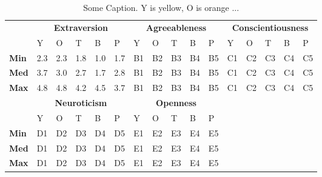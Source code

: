 \begin{table}
\renewcommand{\arraystretch}{1.2}
\begin{center}
\begin{tabular}{p{}|
			p{0.025\textwidth}|p{}|p{}|p{}|p{}||
			p{}|p{}|p{}|p{}|p{}||
			p{}|p{}|p{}|p{}|p{}|}
\cline{2-16}
  & \multicolumn{5}{c||}{\textbf{Extraversion}} & \multicolumn{5}{c||}{\textbf{Agreeableness}} & \multicolumn{5}{c|}{\textbf{Conscientiousness}} \\
\cline{2-16}
 			& Y & O & T & B & P 			& Y & O & T & B & P  	 	& Y & O & T & B & P     \\
\cline{2-16}
\textbf{Min}  	& 2.3 & 2.3 & 1.8 & 1.0 & 1.7 		& B1 & B2 & B3 & B4 & B5  	& C1 & C2 & C3 & C4 & C5  \\

\textbf{Med} 	& 3.7 & 3.0 & 2.7 & 1.7 & 2.8 		& B1 & B2 & B3 & B4 & B5  	& C1 & C2 & C3 & C4 & C5  \\

\textbf{Max}	& 4.8 & 4.8 & 4.2 & 4.5 & 3.7 		& B1 & B2 & B3 & B4 & B5  	& C1 & C2 & C3 & C4 & C5 \\
\cline{2-16}

\cline{2-11}
&  \multicolumn{5}{|c||}{\textbf{Neuroticism}} & \multicolumn{5}{|c||}{\textbf{Openness}} \\
\cline{2-11}
				& Y & O & T & B & P 			& Y & O & T & B & P    		\\
\cline{2-11}
	\textbf{Min} 	& D1 & D2 & D3 & D4 & D5 		& E1 & E2 & E3 & E4 & E5 	\\

	\textbf{Med}  & D1 & D2 & D3 & D4 & D5 		& E1 & E2 & E3 & E4 & E5 	\\

	\textbf{Max}  	& D1 & D2 & D3 & D4 & D5 		& E1 & E2 & E3 & E4 & E5  	\\
\cline{2-11}

\end{tabular}
\end{center}
\caption{Some Caption. Y is yellow, O is orange ...}
\label{table:e-c}
\end{table}


